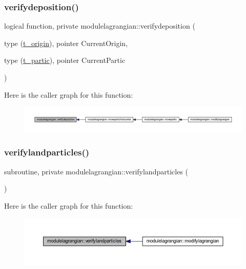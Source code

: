 \subsubsection{\texorpdfstring{verifydeposition()}{verifydeposition()}}
{\footnotesize\ttfamily logical function, private modulelagrangian\+::verifydeposition (\begin{DoxyParamCaption}\item[{type (\mbox{\hyperlink{structmodulelagrangian_1_1t__origin}{t\+\_\+origin}}), pointer}]{Current\+Origin,  }\item[{type (\mbox{\hyperlink{structmodulelagrangian_1_1t__partic}{t\+\_\+partic}}), pointer}]{Current\+Partic }\end{DoxyParamCaption})\hspace{0.3cm}{\ttfamily [private]}}

Here is the caller graph for this function\+:\nopagebreak
\begin{figure}[H]
\begin{center}
\leavevmode
\includegraphics[width=350pt]{namespacemodulelagrangian_a707d19136d3ce2d287f6e476d28385c8_icgraph}
\end{center}
\end{figure}
\mbox{\label{namespacemodulelagrangian_a96db0d2ce32abc9c42eea8890f665798}} 
\subsubsection{\texorpdfstring{verifylandparticles()}{verifylandparticles()}}
{\footnotesize\ttfamily subroutine, private modulelagrangian\+::verifylandparticles (\begin{DoxyParamCaption}{ }\end{DoxyParamCaption})\hspace{0.3cm}{\ttfamily [private]}}

Here is the caller graph for this function\+:\nopagebreak
\begin{figure}[H]
\begin{center}
\leavevmode
\includegraphics[width=350pt]{namespacemodulelagrangian_a96db0d2ce32abc9c42eea8890f665798_icgraph}
\end{center}
\end{figure}
\mbox{\label{namespacemodulelagrangian_a3afb63d9461c6e731400252243804a3b}} 
